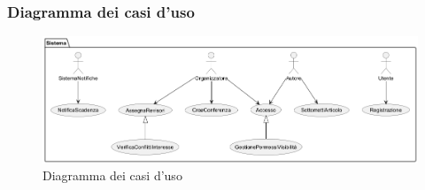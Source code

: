 \subsubsection{Diagramma dei casi d'uso}
\label{sec:diagramma_casi_uso}

\begin{figure}[!ht]
  \centering
  \includegraphics[width=\linewidth]{./VisualParadigm/diagramma_uso.png}
  \caption{Diagramma dei casi d'uso}
  \label{fig:diagramma_uso}
\end{figure}

